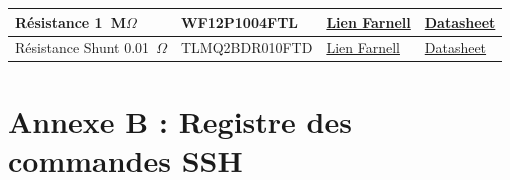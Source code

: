 \begin{tableau}[H]
{\begin{tabular}{|l|l|l|l|}
        Résistance 1~M$\Omega$ & WF12P1004FTL & \href{https://fr.farnell.com/multicomp-pro/wf12p1004ftl/resist-couche-epaisse-1m-1-200v/dp/2502774}{Lien Farnell} & \href{https://www.google.com/search?q=https://octopart.com/search\%3Fq\%3DWF12P1004FTL}{Datasheet} \\
        \hline
        Résistance Shunt 0.01~$\Omega$ & TLMQ2BDR010FTD & \href{https://fr.farnell.com/cgs-te-connectivity/tlmq2bdr010ftd/res-0r01-1w-metallique-1206/dp/4690300}{Lien Farnell} & \href{https://www.google.com/search?q=https://octopart.com/search\%3Fq\%3DTLMQ2BDR010FTD}{Datasheet} \\
        \hline
    \end{tabular}
    }
    \caption{Nomenclature (BOM) détaillée des composants électroniques.}
\end{tableau}


\section*{Annexe B : Registre des commandes SSH}

